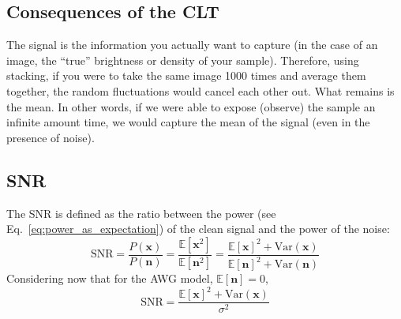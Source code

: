 \subsection{Consequences of the \gls{CLT}}
The signal is the information you actually want to capture (in the
case of an image, the ``true'' brightness or density of your
sample). Therefore, using stacking, if you were to take the same
image 1000 times and average them together, the random fluctuations
would cancel each other out. What remains is the mean. In other words,
if we were able to expose (observe) the sample an infinite amount
time, we would capture the mean of the signal (even in the presence of
noise).




\subsection{\gls{SNR}}
The \gls{SNR} is defined as the ratio between the power (see
Eq.~\ref{eq:power_as_expectation}) of the clean signal and the power of
the noise:
\begin{equation}
  \text{SNR} = \frac{P(\bm{x})}{P(\bm{n})} = \frac{\mathbb{E}[\bm{x}^2]}{\mathbb{E}[\bm{n}^2]} = \frac{\mathbb{E}[\bm{x}]^2+\text{Var}(\bm{x})}{\mathbb{E}[\bm{n}]^2+\text{Var}(\bm{n})}
\end{equation}
Considering now that for the \gls{AWG} model, $\mathbb{E}[\bm{n}] = 0$,
\begin{equation}
  \text{SNR} = \frac{\mathbb{E}[\bm{x}]^2+\text{Var}(\bm{x})}{\sigma^2}
\end{equation}

